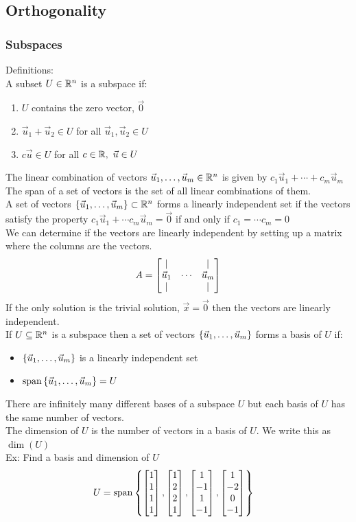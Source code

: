 \documentclass[11pt, fleqn]{article}
\begin{document}
\subsection{Orthogonality}
\subsubsection{Subspaces}
Definitions:\\
A subset $U\in\mathbb{R}^n$ is a subspace if:
\begin{enumerate}
    \item $U$ contains the zero vector, $\vec{0}$
    \item $\vec{u}_1+\vec{u}_2\in U$ for all $\vec{u}_1,\vec{u}_2\in U$
    \item $c\vec{u}\in U$ for all $c\in\mathbb{R},\ \vec{u}\in U$
\end{enumerate}
The linear combination of vectors $\vec{u}_1,\ldots,\vec{u}_m\in\mathbb{R}^n$ is given by $c_1\vec{u}_1+\cdots+c_m\vec{u}_m$\\
The span of a set of vectors is the set of all linear combinations of them.\\
A set of vectors $\left\{ \vec{u}_1,\ldots,\vec{u}_m \right\}\subset\mathbb{R}^n$ forms a linearly independent set if the vectors satisfy the property $c_1\vec{u}_1+\cdots c_m\vec{u}_m=\vec{0}$ if and only if $c_1=\cdots c_m=0$\\
We can determine if the vectors are linearly independent by setting up a matrix where the columns are the vectors.
$$A=\matrixx{| & & |\\ \vec{u}_1 & \cdots & \vec{u}_m\\ | & & |}$$
If the only solution is the trivial solution, $\vec{x}=\vec{0}$ then the vectors are linearly independent.\\
If $U\subseteq\mathbb{R}^n$ is a subspace then a set of vectors $\left\{ \vec{u}_1,\ldots,\vec{u}_m \right\}$ forms a basis of $U$ if:
\begin{itemize}
    \item $\left\{ \vec{u}_1,\ldots,\vec{u}_m \right\}$ is a linearly independent set
    \item $\operatorname{span}\left\{ \vec{u}_1,\ldots,\vec{u}_m \right\}=U$
\end{itemize}
There are infinitely many different bases of a subspace $U$ but each basis of $U$ has the same number of vectors.\\
The dimension of $U$ is the number of vectors in a basis of $U$. We write this as $\dim(U)$\\
Ex: Find a basis and dimension of $U$
\begin{align*}
    &U=\spann\brcurly{\matrixx{1\\1\\1\\1},\matrixx{1\\2\\2\\1},\matrixx{1\\-1\\1\\-1},\matrixx{1\\-2\\0\\-1}}
\end{align*}
\end{document}

